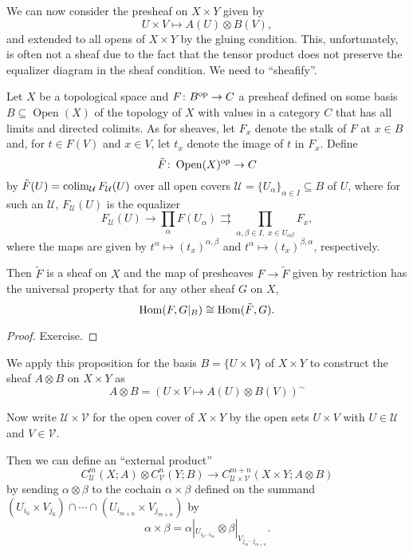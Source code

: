 \documentclass[a4paper,openany]{scrbook}
\DeclareMathOperator{\Open}{Open}
\begin{document}
We can now consider the presheaf on $X \times Y$ given by
\[
U \times V \mapsto A(U) \otimes B(V),
\]
and extended to all opens of $X \times Y$ by the gluing condition. This, unfortunately, is often not a sheaf due to the fact that the tensor product does not preserve the equalizer diagram in the sheaf condition. We need to “sheafify”.

\begin{prop}
\label{prop:sheafification}
Let $X$ be a topological space and $F\colon B^{\operatorname{op}} \to C$ a presheaf defined on some basis $B \subseteq \Open(X)$ of the topology of $X$ with values in a category $C$ that has all limits and directed colimits. As for sheaves, let $F_x$ denote the stalk of $F$ at $x \in B$ and, for $t \in F(V)$ and $x \in V$, let $t_x$ denote the image of $t$ in $F_x$. Define
\[
\tilde F\colon \Open(X)^\op \to C
\]
by $\tilde F(U) = \operatorname*{colim}_{\mathcal U} F_{\mathcal U}(U)$ over all open covers $\mathcal U = \{U_\alpha\}_{\alpha \in I} \subseteq B$ of $U$, where for such an $\mathcal U$, $F_{\mathcal U}(U)$ is the equalizer
\[
F_{\mathcal U}(U) \to \prod_{\alpha} F(U_\alpha) \rightrightarrows \prod_{\alpha,\beta \in I,\; x \in U_{\alpha\beta}} F_x,
\]
where the maps are given by $t^\alpha \mapsto (t_x)^{\alpha,\beta}$ and $t^\alpha \mapsto (t_x)^{\beta,\alpha}$, respectively.

Then $\tilde F$ is a sheaf on $X$ and the map of presheaves $F \to \tilde F$ given by restriction has the universal property that for any other sheaf $G$ on $X$,
\[
\operatorname{Hom}(F,G|_B) \cong \operatorname{Hom}(\tilde F,G).
\]
\end{prop}
\begin{proof}
Exercise.
\end{proof}

We apply this proposition for the basis $B=\{U \times V\}$ of $X \times Y$ to construct the sheaf $A \otimes B$ on $X \times Y$ as
\[
A \otimes B = (U \times V \mapsto A(U) \otimes B(V))^{\sim}
\]

Now write $\mathcal U \times \mathcal V$ for the open cover of $X \times Y$ by the open sets $U \times V$ with $U \in \mathcal U$ and $V \in \mathcal V$.

Then we can define an “external product”
\begin{equation}\label{eq:crossproduct}
C^m_{\mathcal U}(X;A) \otimes C^n_{\mathcal V}(Y;B) \to C^{m+n}_{\mathcal U \times \mathcal V}(X\times Y;A \otimes B)
\end{equation}
by sending $\alpha \otimes \beta$ to the cochain $\alpha \times \beta$ defined on the summand $(U_{i_0} \times V_{j_0}) \cap \cdots \cap (U_{i_{m+n}} \times V_{j_{m+n}})$ by
\[
\alpha \times \beta = \alpha|_{U_{i_0\cdots i_m}} \otimes \beta|_{V_{j_m\cdots j_{m+n}}}.
\]
\end{document}
